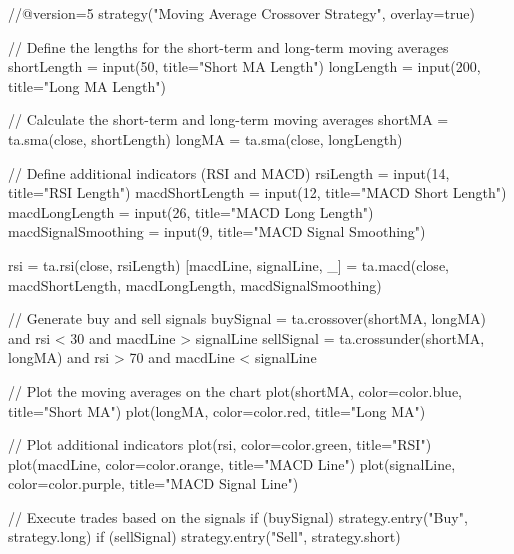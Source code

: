 //@version=5
strategy("Moving Average Crossover Strategy", overlay=true)

// Define the lengths for the short-term and long-term moving averages
shortLength = input(50, title="Short MA Length")
longLength = input(200, title="Long MA Length")

// Calculate the short-term and long-term moving averages
shortMA = ta.sma(close, shortLength)
longMA = ta.sma(close, longLength)

// Define additional indicators (RSI and MACD)
rsiLength = input(14, title="RSI Length")
macdShortLength = input(12, title="MACD Short Length")
macdLongLength = input(26, title="MACD Long Length")
macdSignalSmoothing = input(9, title="MACD Signal Smoothing")

rsi = ta.rsi(close, rsiLength)
[macdLine, signalLine, _] = ta.macd(close, macdShortLength, macdLongLength, macdSignalSmoothing)

// Generate buy and sell signals
buySignal = ta.crossover(shortMA, longMA) and rsi < 30 and macdLine > signalLine
sellSignal = ta.crossunder(shortMA, longMA) and rsi > 70 and macdLine < signalLine

// Plot the moving averages on the chart
plot(shortMA, color=color.blue, title="Short MA")
plot(longMA, color=color.red, title="Long MA")

// Plot additional indicators
plot(rsi, color=color.green, title="RSI")
plot(macdLine, color=color.orange, title="MACD Line")
plot(signalLine, color=color.purple, title="MACD Signal Line")

// Execute trades based on the signals
if (buySignal)
    strategy.entry("Buy", strategy.long)
if (sellSignal)
    strategy.entry("Sell", strategy.short)